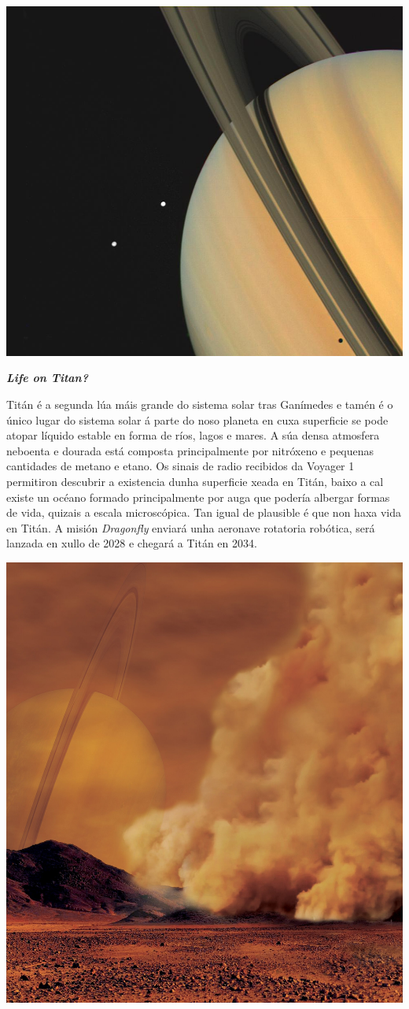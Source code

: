 \begin{refsection}
\begin{multicols}{2}
\begin{center}
    \includegraphics[width=0.8\linewidth]{revistas/002/imaxes/saturno.jpg}
\end{center}

\textbf{\textit{Life on Titan?}}

Titán é a segunda lúa máis grande do sistema solar tras Ganímedes e tamén é o
único lugar do sistema solar á parte do noso planeta en cuxa superficie se pode
atopar líquido estable en forma de ríos, lagos e mares. A súa densa atmosfera
neboenta e dourada está composta principalmente por nitróxeno e pequenas
cantidades de metano e etano. Os sinais de radio recibidos da Voyager 1
permitiron descubrir a existencia dunha superficie xeada en Titán, baixo a cal
existe un océano formado principalmente por auga que podería albergar formas de
vida, quizais a escala microscópica. Tan igual de plausible é que non haxa vida
en Titán. A misión \textit{Dragonfly} enviará unha aeronave rotatoria robótica,
será lanzada en xullo de 2028 e chegará a Titán en 2034.
\begin{center}
    \includegraphics[width=0.6\linewidth]{revistas/002/imaxes/Dust_storm_on_Titan_pillars_corte.jpg}
\end{center}



\end{multicols}
\end{refsection}

